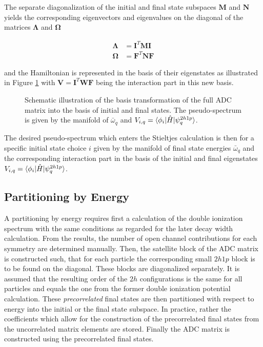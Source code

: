 The separate diagonalization of the initial and final state subspaces
$\mathbf{M}$ and $\mathbf{N}$ yields
the corresponding eigenvectors and eigenvalues on the diagonal of the
matrices $\mathbf{\Lambda}$ and $\mathbf{\Omega}$

\begin{align}
  \mathbf{\Lambda} &= \mathbf{I}^T \mathbf{M} \mathbf{I}  \\
  \mathbf{\Omega}  &= \mathbf{F}^T \mathbf{N} \mathbf{F} 
\end{align}

and the Hamiltonian is represented in the basis of their eigenstates
as illustrated in
Figure \ref{figure:fano_bastrans} with $\mathbf{V} = \mathbf{I}^T \mathbf{W} \mathbf{F}$
being the interaction part
in this new basis.

\begin{figure}[h]
  \centering
  
  \caption{Schematic illustration of the basis transformation of the full \ac{ADC}
           matrix into the basis of initial and final states. The pseudo-spectrum
           is given by the manifold of $\bar{\omega}_q$ and
           $V_{i,q} = \braket{\phi_i |\hat{H}| \psi_{q}^{2h1p}}$.}
  \label{figure:fano_bastrans}
\end{figure}
The desired pseudo-spectrum which enters the Stieltjes calculation
is then for a specific initial state choice $i$ given by the
manifold of final state energies
$\bar{\omega}_q$ and the corresponding interaction part in the
basis of the initial and
final eigenstates 
$V_{i,q} = \braket{\phi_i |\hat{H}| \psi_{q}^{2h1p}}$.



\subsection{Partitioning by Energy}
A partitioning by energy requires first a calculation of the double ionization
spectrum with the same conditions as regarded for the later decay width
calculation. From the results, the number of open channel contributions
for each symmetry are determined manually. Then, the satellite block
of the \ac{ADC} matrix is constructed such, that for each particle the
corresponding
small $2h1p$ block is to be found on the diagonal. These blocks are diagonalized
separately.
It is assumed that the resulting order of the $2h$ configurations is the
same for all particles and equals the one from the former double ionization
potential calculation. These \textit{precorrelated} final states are then
partitioned with respect to energy into the initial or the final state
subspace. In practice, rather the coefficients which allow for the construction
of the precorrelated final states from the uncorrelated matrix elements are stored.
Finally the \ac{ADC} matrix is constructed using the precorrelated final states.

